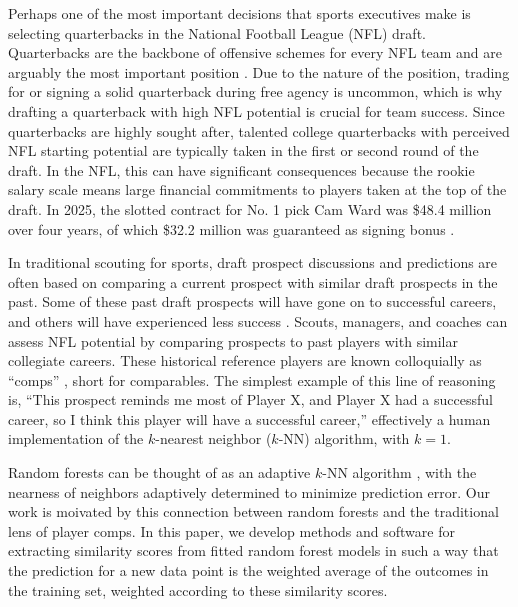 \documentclass{article}
\begin{document}
Perhaps one of the most important decisions that sports executives make is selecting quarterbacks in the National Football League (NFL) draft. Quarterbacks are the backbone of offensive schemes for every NFL team and are arguably the most important position \citep{hughes_positional_2015}. Due to the nature of the position, trading for or signing a solid quarterback during free agency is uncommon, which is why drafting a quarterback with high NFL potential is crucial for team success. Since quarterbacks are highly sought after, talented college quarterbacks with perceived NFL starting potential are typically taken in the first or second round of the draft. In the NFL, this can have significant consequences because the rookie salary scale means large financial commitments to players taken at the top of the draft. In 2025, the slotted contract for No. 1 pick Cam Ward was \$48.4 million over four years, of which \$32.2 million was guaranteed as signing bonus \citep{badenhausen_nfl_2025}.

In traditional scouting for sports, draft prospect discussions and predictions are often based on comparing a current prospect with similar draft prospects in the past. Some of these past draft prospects will have gone on to successful careers, and others will have experienced less success \citep{trapasso_nfl_2025}. Scouts, managers, and coaches can assess NFL potential by comparing prospects to past players with similar collegiate careers. These historical reference players are known colloquially as ``comps'' \citep{jones_nfl_2025}, short for comparables. The simplest example of this line of reasoning is, ``This prospect reminds me most of Player X, and Player X had a successful career, so I think this player will have a successful career,'' effectively a human implementation of the $k$-nearest neighbor ($k$-NN) algorithm, with $k = 1$.

Random forests can be thought of as an adaptive $k$-NN algorithm \citep{lin_random_2006}, with the nearness of neighbors adaptively determined to minimize prediction error. Our work is moivated by this connection between random forests and the traditional lens of player comps. In this paper, we develop methods and software for extracting similarity scores from fitted random forest models in such a way that the prediction for a new data point is the weighted average of the outcomes in the training set, weighted according to these similarity scores.
\end{document}

